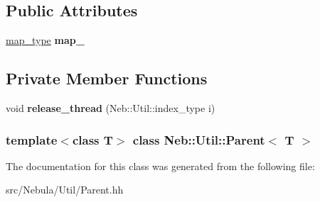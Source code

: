 \subsection*{\-Public \-Attributes}
\begin{DoxyCompactItemize}
\item 
\hypertarget{classNeb_1_1Util_1_1Parent_a3e3e79754934bf9279c4b94f7f635b3c}{\hyperlink{classNeb_1_1Map}{map\-\_\-type} {\bfseries map\-\_\-}}\label{classNeb_1_1Util_1_1Parent_a3e3e79754934bf9279c4b94f7f635b3c}

\end{DoxyCompactItemize}
\subsection*{\-Private \-Member \-Functions}
\begin{DoxyCompactItemize}
\item 
\hypertarget{classNeb_1_1Util_1_1Parent_aa8e13a90812145031738d6ba6cfed9b3}{void {\bfseries release\-\_\-thread} (\-Neb\-::\-Util\-::index\-\_\-type i)}\label{classNeb_1_1Util_1_1Parent_aa8e13a90812145031738d6ba6cfed9b3}

\end{DoxyCompactItemize}
\subsubsection*{template$<$class \-T$>$ class Neb\-::\-Util\-::\-Parent$<$ T $>$}



\-The documentation for this class was generated from the following file\-:\begin{DoxyCompactItemize}
\item 
src/\-Nebula/\-Util/\-Parent.\-hh\end{DoxyCompactItemize}

